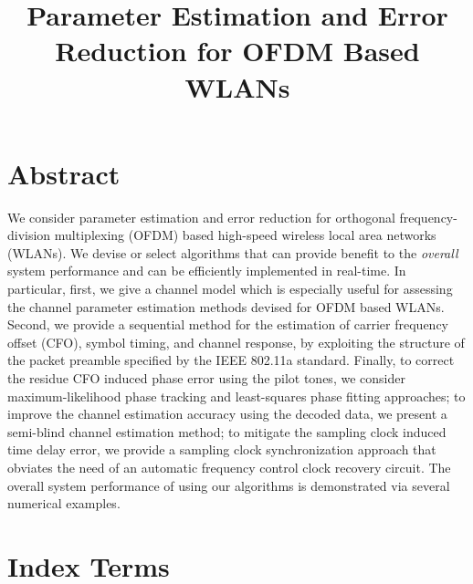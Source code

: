 \documentclass[11pt,draftnofoot,onecolumn]{IEEEtran}
\def\spacingset#1{\def\baselinestretch{#1}\small\normalsize}
\begin{document}
\spacingset{1.5}


\title{Parameter Estimation and Error Reduction for OFDM Based WLANs}
%
\author{
\and {}
%
}
%
%
\maketitle%
%


\section*{Abstract}

We consider parameter estimation and error reduction for
orthogonal frequency-division multiplexing 
(OFDM) based high-speed
wireless local area networks (WLANs).
We devise or select algorithms that can provide benefit to the 
{\em overall} system performance and can be efficiently
implemented in real-time. In particular,
first, we give a channel model which 
is especially useful for assessing
the channel parameter estimation methods devised for OFDM based WLANs. 
Second, we provide  
a sequential method for the estimation 
of carrier frequency offset (CFO), symbol timing, and channel response, 
by exploiting the structure of the packet
preamble specified by the IEEE 802.11a standard.
Finally, %
to correct the residue CFO induced phase error using the pilot tones, 
we consider maximum-likelihood phase tracking and 
least-squares phase fitting approaches;
to improve the channel estimation accuracy using
the decoded data, we present a semi-blind
channel estimation method; 
to mitigate the sampling clock induced 
time delay error, we provide a 
sampling clock synchronization approach 
that obviates the need of an automatic frequency control
clock recovery circuit.
The overall system performance of using our algorithms is demonstrated 
via several numerical examples.


\section*{ Index Terms}
\end{document}
